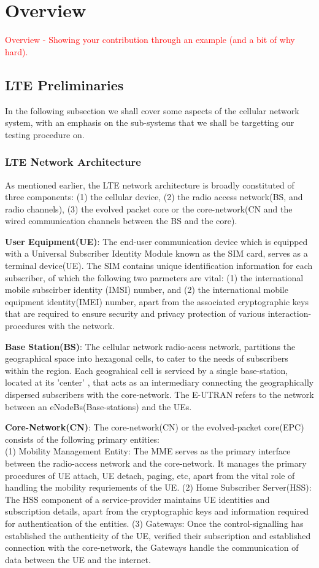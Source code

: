 \documentclass[acmsmall,review,authorversion]{acmart}
\begin{document}
\section{Overview}
\textcolor{red}{
Overview
- Showing your contribution through an example (and a bit of why hard).
}

\subsection{LTE Preliminaries}

In the following subsection we shall cover some aspects of the cellular network system, with an emphasis on the sub-systems that we shall be targetting our testing procedure on. 

\subsubsection{LTE Network Architecture}
As mentioned earlier, the LTE network architecture is broadly constituted of three components: (1) the cellular device, (2) the radio access network(BS, and radio channels), (3) the evolved packet core or the core-network(CN and the wired communication channels between the BS and the core). 

\textbf{User Equipment(UE)}: The end-user communication device which is equipped with a Universal Subscriber Identity Module known as the SIM card, serves as a terminal device(UE). The SIM contains unique identification information for each subscriber, of which the following two parmeters are vital: (1) the international mobile subscirber identity (IMSI) number, and (2) the international mobile equipment identity(IMEI) number, apart from the associated cryptographic keys that are required to ensure security and privacy protection of various interaction-procedures with the network. 

\textbf{Base Station(BS)}: The cellular network radio-acess network, partitions the geographical space into hexagonal cells, to cater to the needs of subscribers within the region. Each geograhical cell is serviced by a single base-station, located at its 'center' , that acts as an intermediary connecting the geographically dispersed subscribers with the core-network. The E-UTRAN refers to the network between an eNodeBs(Base-stations) and the UEs. 

\textbf{Core-Network(CN)}: The core-network(CN) or the evolved-packet core(EPC) consists of the following primary entities: \\
(1) Mobility Management Entity: The MME serves as the primary interface between the radio-access network and the core-network. It manages the primary procedures of UE attach, UE detach, paging, etc, apart from the vital role of handling the mobility requriements of the UE. 
(2) Home Subscriber Server(HSS): The HSS component of a service-provider maintains UE identities and subscription details, apart from the cryptographic keys and information required for authentication of the entities. 
(3) Gateways: Once the control-signalling has established the authenticity of the UE, verified their subscription and established connection with the core-network, the Gateways handle the communication of data between the UE and the internet. 
\end{document}
